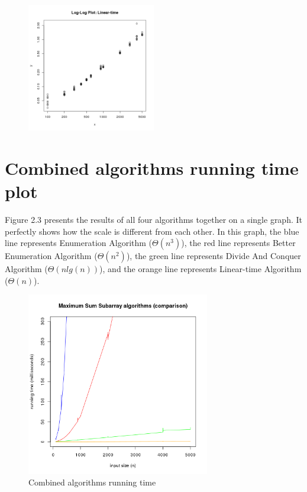 \documentclass[11pt]{scrreprt}
\begin{document}
\begin{figure}[!htbp]
{		\includegraphics[width=0.50\textwidth]{loglog_linear_time.png}%
	}%
\end{figure}


\section{Combined algorithms running time plot}

Figure 2.3 presents the results of all four algorithms together on a single graph. It perfectly shows how the scale is different from each other. In this graph, the blue line represents Enumeration Algorithm ($\Theta(n^3)$), the red line represents Better Enumeration Algorithm ($\Theta(n^2)$), the green line represents Divide And Conquer Algorithm ($\Theta(nlg(n))$), and the orange line represents Linear-time Algorithm ($\Theta(n)$).

\begin{figure}[!htbp]
\centering
\includegraphics[width=8cm]{combined.png}
\caption{Combined algorithms running time}
\label{fig3}
\end{figure}
\end{document}
